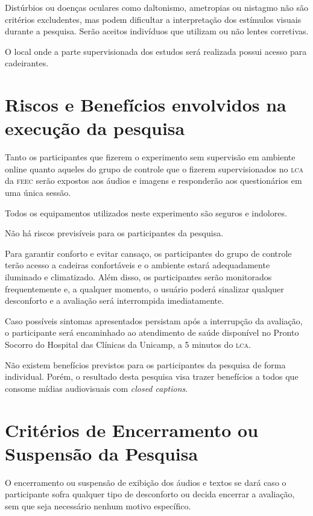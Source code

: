 \documentclass[a4paper,11pt,titlepage,singlespacing]{article}
\begin{document}
Distúrbios ou doenças oculares como daltonismo, ametropias ou nistagmo não são critérios excludentes, mas podem dificultar a interpretação dos estímulos visuais durante a pesquisa. Serão aceitos indivíduos que utilizam ou não lentes corretivas. 

O local onde a parte supervisionada dos estudos será realizada possui acesso para cadeirantes.

\section{Riscos e Benefícios envolvidos na execução da pesquisa}
\noindent Tanto os participantes que fizerem o experimento sem supervisão em ambiente online quanto aqueles do grupo de controle que o fizerem supervisionados no \textsc{lca} da \textsc{feec} serão expostos aos áudios e imagens e responderão aos questionários em uma única sessão.

Todos os equipamentos utilizados neste experimento são seguros e indolores. 

Não há riscos previsíveis para os participantes da pesquisa.

Para garantir conforto e evitar cansaço, os participantes do grupo de controle terão acesso a cadeiras confortáveis e o ambiente estará adequadamente iluminado e climatizado. Além disso, os participantes serão monitorados frequentemente e, a qualquer momento, o usuário poderá sinalizar qualquer desconforto e a avaliação será interrompida imediatamente. 

Caso possíveis sintomas apresentados persistam após a interrupção da avaliação, o participante será encaminhado ao atendimento de saúde disponível no Pronto Socorro do Hospital das Clínicas da Unicamp, a 5 minutos do \textsc{lca}.

Não existem benefícios previstos para os participantes da pesquisa de forma individual. Porém, o resultado desta pesquisa visa trazer benefícios a todos que consome mídias audiovisuais com \textit{closed captions}.

\section{Critérios de Encerramento ou Suspensão da Pesquisa}
\noindent O encerramento ou suspensão de exibição dos áudios e textos se dará caso o participante sofra qualquer tipo de desconforto ou decida encerrar a avaliação, sem que seja necessário nenhum motivo específico. 
\end{document}
